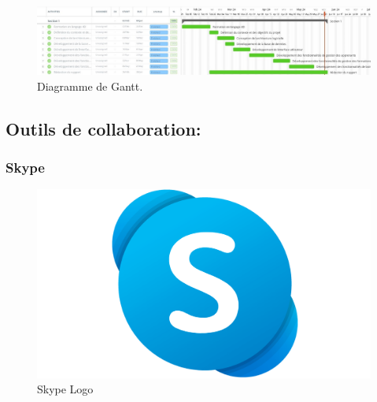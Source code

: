 \begin{figure}
    \centering
    \includegraphics[width=\textheight,height=\textwidth,keepaspectratio]{Figures/DiagrammeDeGantt.jpg}
    \caption{Diagramme de Gantt.}
\end{figure}

\newpage
\subsection{Outils de collaboration:}

\subsubsection{Skype}

\begin{figure}[h]
    \centering
    \includegraphics[scale=0.02]{Logos/Skype-Logo.png} %
    \caption{Skype Logo}
\end{figure}

